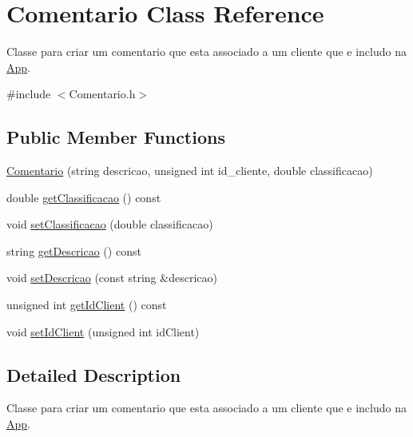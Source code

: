 \hypertarget{class_comentario}{\section{Comentario Class Reference}
\label{class_comentario}
}


Classe para criar um comentario que esta associado a um cliente que e includo na \hyperlink{class_app}{App}.  




{\ttfamily \#include $<$Comentario.\+h$>$}

\subsection*{Public Member Functions}
\begin{DoxyCompactItemize}
\item 
\hyperlink{class_comentario_a86098067f03cec1a3b0f11e1890b48d1}{Comentario} (string descricao, unsigned int id\+\_\+cliente, double classificacao)
\item 
double \hyperlink{class_comentario_a72b3f558e4efa7aa193a4a8dcf584342}{get\+Classificacao} () const 
\item 
void \hyperlink{class_comentario_af9f6f741bc2b95e4b9457eae446e8f39}{set\+Classificacao} (double classificacao)
\item 
string \hyperlink{class_comentario_a1b9f374ef488c1fb1332081e767e14e8}{get\+Descricao} () const 
\item 
void \hyperlink{class_comentario_a40aefe877479a08900a1e25803fa8616}{set\+Descricao} (const string \&descricao)
\item 
unsigned int \hyperlink{class_comentario_ab3f00d37b18638e59b7e8e5a8f15c8d5}{get\+Id\+Client} () const 
\item 
void \hyperlink{class_comentario_ab74417e4b1ab747486355e425e1e515a}{set\+Id\+Client} (unsigned int id\+Client)
\end{DoxyCompactItemize}


\subsection{Detailed Description}
Classe para criar um comentario que esta associado a um cliente que e includo na \hyperlink{class_app}{App}. 

